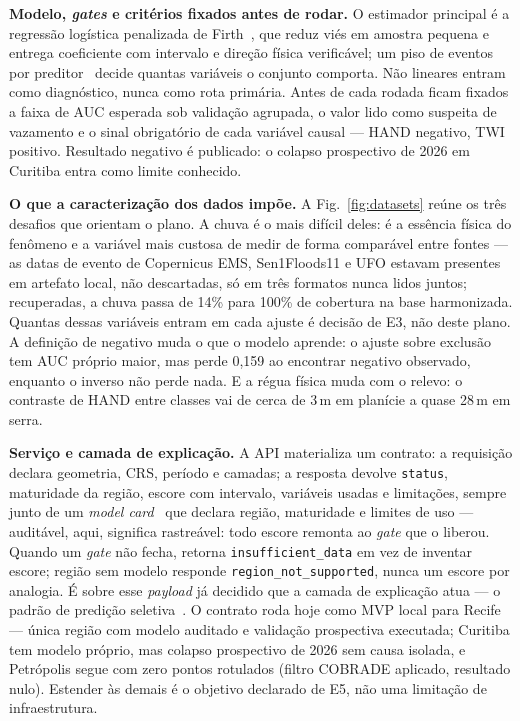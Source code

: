\documentclass[conference]{IEEEtran}
\begin{document}
\textbf{Modelo, \emph{gates} e critérios fixados antes de rodar.} O estimador
principal é a regressão logística penalizada de Firth~\cite{firth1993}, que reduz
viés em amostra pequena e entrega coeficiente com intervalo e direção física
verificável; um piso de eventos por preditor~\cite{peduzzi1996} decide quantas
variáveis o conjunto comporta. Não lineares entram como diagnóstico, nunca como
rota primária. Antes de cada rodada ficam fixados a faixa de AUC esperada sob
validação agrupada, o valor lido como suspeita de vazamento e o sinal obrigatório
de cada variável causal --- HAND negativo, TWI positivo. Resultado negativo é
publicado: o colapso prospectivo de 2026 em Curitiba entra como limite
conhecido.

\textbf{O que a caracterização dos dados impõe.} A Fig.~\ref{fig:datasets} reúne
os três desafios que orientam o plano. A chuva é o mais difícil deles: é a
essência física do fenômeno e a variável mais custosa de medir de forma
comparável entre fontes --- as datas de evento de Copernicus EMS,
Sen1Floods11 e UFO estavam presentes em artefato local, não descartadas, só
em três formatos nunca lidos juntos; recuperadas, a chuva passa de 14\% para
100\% de cobertura na base harmonizada. Quantas dessas variáveis entram em
cada ajuste é decisão de E3, não deste plano. A definição de negativo muda o
que o modelo aprende: o
ajuste sobre exclusão tem AUC próprio maior, mas perde 0,159 ao encontrar
negativo observado, enquanto o inverso não perde nada. E a régua física muda com
o relevo: o contraste de HAND entre classes vai de cerca de 3\,m em planície a
quase 28\,m em serra.

\textbf{Serviço e camada de explicação.} A API materializa um contrato: a
requisição declara geometria, CRS, período e camadas; a resposta devolve
\texttt{status}, maturidade da região, escore com intervalo, variáveis usadas e
limitações, sempre junto de um \emph{model card}~\cite{mitchell2019} que declara
região, maturidade e limites de uso --- auditável, aqui, significa rastreável:
todo escore remonta ao \emph{gate} que o liberou. Quando um \emph{gate} não
fecha, retorna \texttt{insufficient\_data} em vez de inventar escore; região sem
modelo responde \texttt{region\_not\_supported}, nunca um escore por analogia. É
sobre esse \emph{payload} já decidido que a camada de explicação atua --- o
padrão de predição seletiva~\cite{mitchell2019}. O contrato roda hoje como MVP
local para Recife --- única região com modelo auditado e validação
prospectiva executada; Curitiba tem modelo próprio, mas colapso prospectivo de
2026 sem causa isolada, e Petrópolis segue com zero pontos rotulados (filtro
COBRADE aplicado, resultado nulo). Estender às demais é o objetivo declarado
de E5, não uma limitação de infraestrutura.
\end{document}
